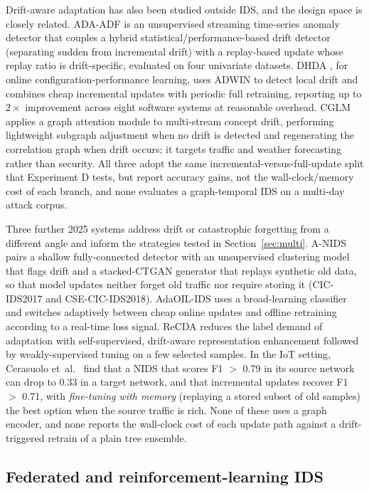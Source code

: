 \documentclass[twocolumn]{llncs}
\begin{document}
Drift-aware adaptation has also been studied outside IDS, and the design space is closely related.
ADA-ADF \cite{li2025adaadf} is an unsupervised streaming time-series anomaly detector that couples a
hybrid statistical/performance-based drift detector (separating sudden from incremental drift) with a
replay-based update whose replay ratio is drift-specific, evaluated on four univariate datasets.
DHDA \cite{xiang2026dhda}, for online configuration-performance learning, uses ADWIN to detect local
drift and combines cheap incremental updates with periodic full retraining, reporting up to $2\times$
improvement across eight software systems at reasonable overhead. CGLM \cite{zhou2025cglm} applies a
graph attention module to multi-stream concept drift, performing lightweight subgraph adjustment when
no drift is detected and regenerating the correlation graph when drift occurs; it targets traffic and
weather forecasting rather than security. All three adopt the same incremental-versus-full-update
split that Experiment D tests, but report accuracy gains, not the wall-clock/memory cost of each
branch, and none evaluates a graph-temporal IDS on a multi-day attack corpus.


Three further 2025 systems address drift or catastrophic forgetting from a different angle and
inform the strategies tested in Section~\ref{sec:multi}. A-NIDS \cite{zha2025anids} pairs a shallow
fully-connected detector with an unsupervised clustering model that flags drift and a stacked-CTGAN
generator that replays synthetic old data, so that model updates neither forget old traffic nor
require storing it (CIC-IDS2017 and CSE-CIC-IDS2018). AdaOIL-IDS \cite{lu2025adaoil} uses a
broad-learning classifier and switches adaptively between cheap online updates and offline
retraining according to a real-time loss signal. ReCDA \cite{yang2025recda} reduces the label demand
of adaptation with self-supervised, drift-aware representation enhancement followed by
weakly-supervised tuning on a few selected samples. In the IoT setting, Cerasuolo et~al.\
\cite{cerasuolo2025adaptable} find that a NIDS that scores F1 $>$ 0.79 in its source network can drop
to 0.33 in a target network, and that incremental updates recover F1 $>$ 0.71, with
\emph{fine-tuning with memory} (replaying a stored subset of old samples) the best option when the
source traffic is rich. None of these uses a graph encoder, and none reports the wall-clock cost of
each update path against a drift-triggered retrain of a plain tree ensemble.

\subsection{Federated and reinforcement-learning IDS}
\end{document}
